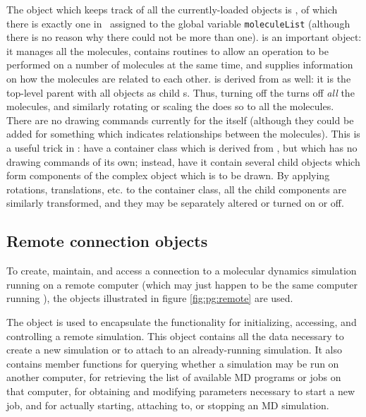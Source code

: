 The object which keeps track of all the currently-loaded  objects is , of which there is exactly one in \VMD\ assigned to the global variable {\tt moleculeList} (although there is no reason why there could not be more than one).   is an important object: it manages all the molecules, contains routines to allow an operation to be performed on a number of molecules at the same time, and supplies information on how the molecules are related to each other.   is derived from  as well: it is the top-level parent  with all  objects as child s.  Thus, turning off the  turns off {\em all} the molecules, and similarly rotating or scaling the  does so to all the molecules.  There are no drawing commands currently for the  itself (although they could be added for something which indicates relationships between the molecules).  This is a useful trick in \VMD: have a container class which is derived from , but which has no drawing commands of its own; instead, have it contain several child  objects which form components of the complex object which is to be drawn.  By applying rotations, translations, etc. to the container class, all the child components are similarly transformed, and they may be separately altered or turned on or off.

\subsection{Remote connection objects}

To create, maintain, and access a connection to a molecular dynamics simulation running on a remote computer (which may just happen to be the same computer running \VMD), the objects illustrated in figure \ref{fig:pg:remote} are used.

\begin{centering}
\end{centering}

The  object is used to encapsulate the functionality for initializing, accessing, and controlling a remote simulation.  This object contains all the data necessary to create a new simulation or to attach to an already-running simulation.  It also contains member functions for querying whether a simulation may be run on another computer, for retrieving the list of available MD programs or jobs on that computer, for obtaining and modifying parameters necessary to start a new job, and for actually starting, attaching to, or stopping an MD simulation.

